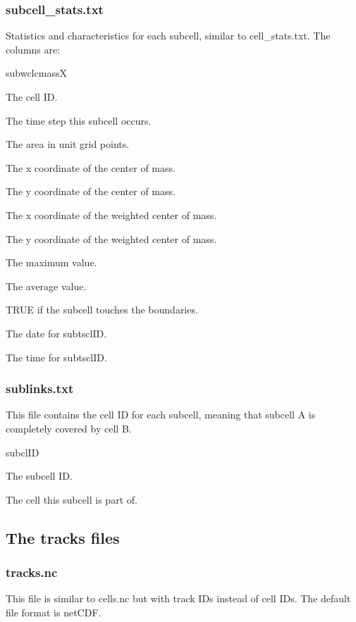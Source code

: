 \documentclass{scrartcl}
\begin{document}
\subsubsection{subcell\_stats.txt}
Statistics and characteristics for each subcell, similar to cell\_stats.txt. The columns are:
\begin{labeling}{subwclcmassX}
    \item[subclID] The cell ID.
    \item[subtsclID] The time step this subcell occurs.
    \item[subclarea] The area in unit grid points.
    \item[subclcmassX] The x coordinate of the center of mass.
    \item[subclcmassY] The y coordinate of the center of mass.
    \item[subwclcmassX] The x coordinate of the weighted center of mass.
    \item[subwclcmassY] The y coordinate of the weighted center of mass.
    \item[subpeakVal] The maximum value.
    \item[subavVal] The average value.
    \item[subtouchb] TRUE if the subcell touches the boundaries.
    \item[date] The date for subtsclID.
    \item[time] The time for subtsclID.
\end{labeling}

\subsubsection{sublinks.txt}
This file contains the cell ID for each subcell, meaning that subcell A is completely covered by cell B.
\begin{labeling}{subclID}
    \item[subclID] The subcell ID.
    \item[clID] The cell this subcell is part of.
    
\end{labeling}


\subsection{The tracks files}
\subsubsection{tracks.nc}
This file is similar to cells.nc but with track IDs instead of cell IDs. The default file format is netCDF.
\end{document}
